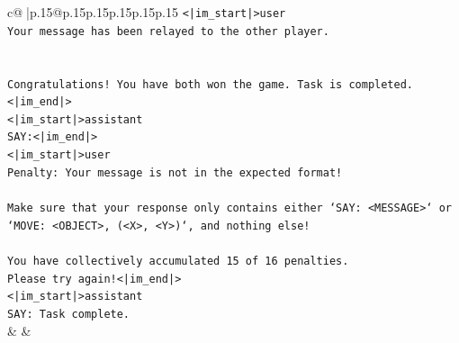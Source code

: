 \documentclass{article}
\begin{document}
{\begin{supertabular}{c@{$\;$}|p{.15\linewidth}@{}p{.15\linewidth}p{.15\linewidth}p{.15\linewidth}p{.15\linewidth}p{.15\linewidth}}
{{{\texttt{<|im\_start|>user} \\
\texttt{Your message has been relayed to the other player.} \\
\\ 
\\ 
\texttt{Congratulations! You have both won the game. Task is completed.<|im\_end|>} \\
\texttt{<|im\_start|>assistant} \\
\texttt{SAY:<|im\_end|>} \\
\texttt{<|im\_start|>user} \\
\texttt{Penalty: Your message is not in the expected format!} \\
\\ 
\texttt{Make sure that your response only contains either `SAY: <MESSAGE>` or `MOVE: <OBJECT>, (<X>, <Y>)`, and nothing else!} \\
\\ 
\texttt{You have collectively accumulated 15 of 16 penalties.} \\
\texttt{Please try again!<|im\_end|>} \\
\texttt{<|im\_start|>assistant} \\
\texttt{SAY: Task complete.} \\
            }
        }
    }
    & & \\ \\


\end{supertabular}}
\end{document}
